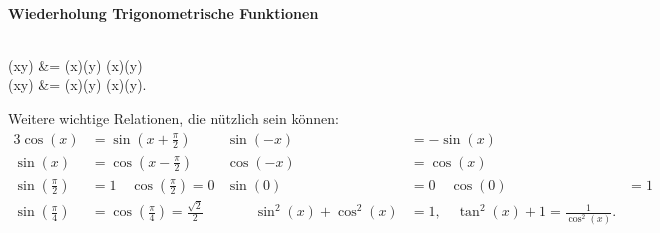 
\paragraph{Wiederholung Trigonometrische Funktionen}$~$

\begin{mymathbox}[ams align, title={Additionstheoreme}, colframe={FSUblau}]
    \sin(x\pm y) &= \sin(x)\cos(y) \pm \cos(x)\sin(y) \\
    \cos(x\pm y) &= \cos(x)\cos(y) \mp \sin(x)\sin(y).
\end{mymathbox}
Weitere wichtige Relationen, die nützlich sein können: 
\begin{alignat}{3}
    \cos(x) &= \sin(x+\frac{\pi}{2}) \quad & \sin(-x) &= - \sin(x)\\
    \sin(x) &= \cos(x-\frac{\pi}{2}) \quad & \cos(-x) &= \cos(x) \\
    \sin(\frac{\pi}{2}) &= 1 \quad \cos(\frac{\pi}{2}) = 0 & \sin(0) &= 0 \quad \cos(0) &= 1\\
    \sin(\frac{\pi}{4}) &= \cos(\frac{\pi}{4}) = \frac{\sqrt{2}}{2} &\qquad  \sin^2(x) + \cos^2(x) &= 1, \quad \tan^2(x) +1 = \frac{1}{\cos^2(x)}.
\end{alignat}

